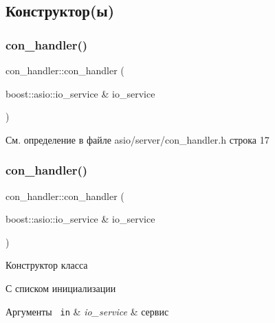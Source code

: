 \subsection{Конструктор(ы)}
\mbox{\label{classcon__handler_a18e7e450430ebe71687a0fd0c79507aa}} 
\subsubsection{\texorpdfstring{con\_handler()}{con\_handler()}\hspace{0.1cm}{\footnotesize\ttfamily [1/2]}}
{\footnotesize\ttfamily con\+\_\+handler\+::con\+\_\+handler (\begin{DoxyParamCaption}\item[{boost\+::asio\+::io\+\_\+service \&}]{io\+\_\+service }\end{DoxyParamCaption})\hspace{0.3cm}{\ttfamily [inline]}}



См. определение в файле asio/server/con\+\_\+handler.\+h строка 17

\mbox{\label{classcon__handler_a18e7e450430ebe71687a0fd0c79507aa}} 
\subsubsection{\texorpdfstring{con\_handler()}{con\_handler()}\hspace{0.1cm}{\footnotesize\ttfamily [2/2]}}
{\footnotesize\ttfamily con\+\_\+handler\+::con\+\_\+handler (\begin{DoxyParamCaption}\item[{boost\+::asio\+::io\+\_\+service \&}]{io\+\_\+service }\end{DoxyParamCaption})\hspace{0.3cm}{\ttfamily [inline]}}



Конструктор класса 

С списком инициализации


\begin{DoxyParams}[1]{Аргументы}
\mbox{\texttt{ in}}  & {\em io\+\_\+service} & сервис \\
\hline
\end{DoxyParams}


